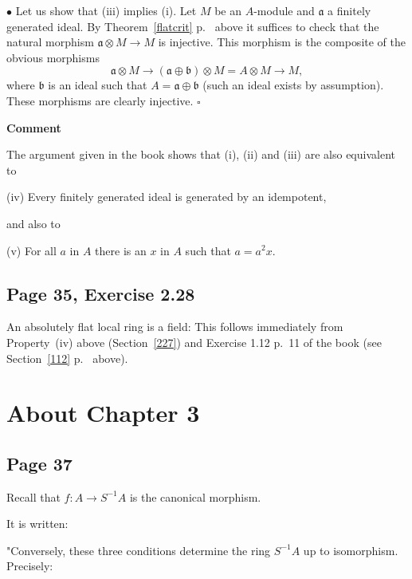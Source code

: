 \documentclass[parskip=half,fontsize=12pt]{scrartcl}%
\newcommand{\mf}{\mathfrak}
\newcommand{\aaa}{\mf a}
\newcommand{\bbb}{\mf b}
\newcommand{\mmm}{\mf m}
\newcommand{\bu}{\bullet}
\begin{document}

$\bu$ Let us show that (iii) implies (i). Let $M$ be an $A$-module and $\aaa$ a finitely generated ideal. By Theorem~\ref{flatcrit} p.~\pageref{flatcrit} above it suffices to check that the natural morphism $\aaa\otimes M\to M$ is injective. This morphism is the composite of the obvious morphisms 
$$
\aaa\otimes M\to(\aaa\oplus\bbb)\otimes M=A\otimes M\to M,
$$ 
where $\bbb$ is an ideal such that $A=\aaa\oplus\bbb$ (such an ideal exists by assumption). These morphisms are clearly injective. $\square$ 

\textbf{Comment}

The argument given in the book shows that (i), (ii) and (iii) are also equivalent to

(iv) Every finitely generated ideal is generated by an idempotent,

and also to 

(v) For all $a$ in $A$ there is an $x$ in $A$ such that $a=a^2x$.

\subsection{Page 35, Exercise 2.28}\label{228}%

An absolutely flat local ring is a field: This follows immediately from Property~(iv) above (Section~\ref{227}) and Exercise 1.12 p.~11 of the book (see Section~\ref{112} p.~\pageref{112} above). %

\section{About Chapter 3}%

\subsection{Page 37}%

Recall that $f:A\to S^{-1}A$ is the canonical morphism.

It is written:

"Conversely, these three conditions determine the ring $S^{-1}A$ up to isomorphism. Precisely:
\end{document}
